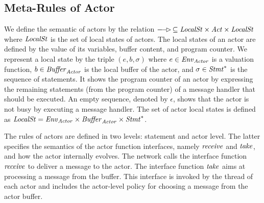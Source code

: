 \subsection{Meta-Rules of Actor}
We define the semantic of actors by the relation $\aoverto{}\,\subseteq \local\times \Act \times \local$ where $\mathit{LocalSt}$ is the set of local states of actors. The local states of an actor are defined by the value of its variables, buffer content, and program counter. We represent a local state by the triple $(e,b,\sigma)$ where $e\in\mathit{Env}_{\it Actor}$ is a valuation function, $b\in\mathit{Buffer}_{\it Actor}$ is the local buffer of the actor, and $\sigma\in \mathit{Stmt}^*$ is the sequence of statements. It shows the program counter of an actor by expressing the remaining statements (from the program counter) of a message handler that should be executed. An empty sequence, denoted by $\epsilon$, shows that the actor is not busy by executing a message handler. The set of actor local states is defined as $\mathit{LocalSt} = \mathit{Env}_{\it Actor}\times\mathit{Buffer}_{\it Actor}\times 
\mathit{Stmt}^\ast$. 

The rules of actors are defined in two levels: statement and actor level. The latter specifies the semantics of the actor function interfaces, namely $\mathit{receive}$ and $\mathit{take}$, and how the actor internally evolves. The network calls the interface function $\mathit{receive}$ to deliver a message to the actor.  The interface function $\mathit{take}$ aims at processing a message from the buffer. This interface is invoked by the thread of each actor and includes the actor-level policy for choosing a message from the actor buffer. 

